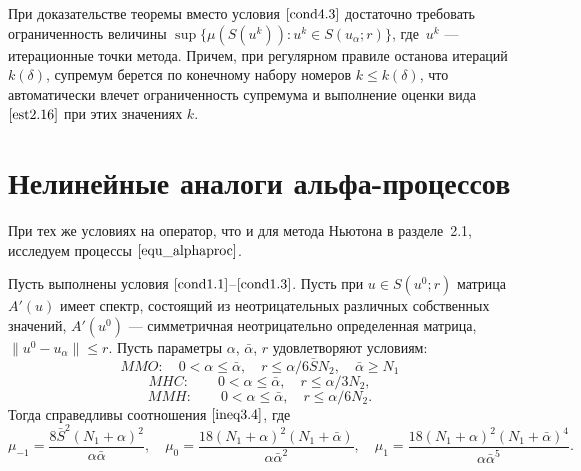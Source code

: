 {\remark При доказательстве теоремы вместо условия  $\eqref{cond4.3}$ достаточно требовать ограниченность величины $\sup\{\mu(S(u^k)): u^k \in S(u_\alpha; r)\}$, где~$u^k$ --- итерационные точки метода. Причем, при регулярном правиле останова итераций $k(\delta)$, супремум берется по конечному набору номеров $k\le k(\delta)$, что автоматически влечет ограниченность супремума и выполнение оценки вида $\eqref{est2.16}$ при этих значениях $k$. %
	}

\newpage
\section{Нелинейные аналоги альфа-процессов}
При тех же условиях на оператор, что и для метода Ньютона в разделе~2.1, исследуем процессы $\eqref{equ_alphaproc}$.
\begin{theorem}\label{teo4.2}
	Пусть выполнены условия $\eqref{cond1.1}$--$\eqref{cond1.3}$. Пусть при $u \in S(u^0; r)$ матрица $A'(u)$ имеет спектр, состоящий из неотрицательных различных собственных значений, $A'(u^0)$ --- симметричная неотрицательно определенная матрица, $\|u^0-u_\alpha\|\le r$. Пусть параметры $\alpha$, $\bar{\alpha}$, $r$ удовлетворяют условиям: 
	\begin{equation}\label{cond4.4}
	MMO:\quad 0<\alpha\le\bar\alpha, \quad r\le\alpha /6\bar SN_2, \quad \bar\alpha \ge N_1
	\end{equation}
	\begin{equation}\label{cond4.5}
	MHC:\qquad 0<\alpha\le\bar\alpha, \quad r\le\alpha /3N_2,
	\end{equation}
	\begin{equation}\label{cond4.6}
	MMH:\qquad 0<\alpha\le\bar\alpha, \quad r\le\alpha /6N_2.
	\end{equation}
	Тогда справедливы соотношения  $\eqref{ineq3.4}$, где
	\begin{equation}\label{eq4.7}
	\mu _{-1}=\frac{8\bar S^2(N_1+\alpha)^2}{\alpha\bar\alpha}, \quad \mu _0=\frac{18(N_1+\alpha)^2(N_1+\bar\alpha)}{\alpha\bar\alpha ^2}, \quad \mu _1=\frac{18(N_1+\alpha)^2(N_1+\bar\alpha)^4}{\alpha\bar\alpha ^5}.
	\end{equation}
\end{theorem}
